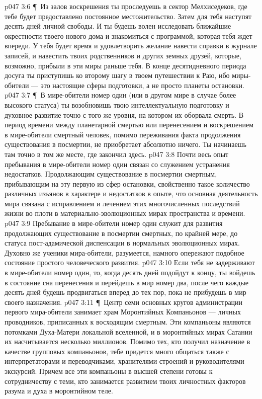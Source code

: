 \vs p047 3:6 \P\ Из залов воскрешения ты проследуешь в сектор Мелхиседеков, где тебе будет предоставлено постоянное местожительство. Затем для тебя наступят десять дней личной свободы. И ты будешь волен исследовать ближайшие окрестности твоего нового дома и знакомиться с программой, которая тебя ждет впереди. У тебя будет время и удовлетворить желание навести справки в журнале записей, и навестить твоих родственников и других земных друзей, которые, возможно, прибыли в эти миры раньше тебя. В конце десятидневного периода досуга ты приступишь ко второму шагу в твоем путешествии к Раю, ибо миры\hyp{}обители --- это настоящие сферы подготовки, а не просто планеты остановки.
\vs p047 3:7 \P\ В мире\hyp{}обители номер один (или в другом мире в случае более высокого статуса) ты возобновишь твою интеллектуальную подготовку и духовное развитие точно с того же уровня, на котором их оборвала смерть. В период времени между планетарной смертью или перенесением и воскрешением в мире\hyp{}обители смертный человек, помимо переживания факта продолжения существования в посмертии, не приобретает абсолютно ничего. Ты начинаешь там точно в том же месте, где закончил здесь.
\vs p047 3:8 Почти весь опыт пребывания в мире\hyp{}обители номер один связан со служением устранения недостатков. Продолжающим существование в посмертии смертным, прибывающим на эту первую из сфер остановки, свойственно такое количество различных изъянов в характере и недостатков в опыте, что основная деятельность мира связана с исправлением и лечением этих многочисленных последствий жизни во плоти в материально\hyp{}эволюционных мирах пространства и времени.
\vs p047 3:9 Пребывание в мире\hyp{}обители номер один служит для развития продолжающих существование в посмертии смертных, по крайней мере, до статуса пост\hyp{}адамической диспенсации в нормальных эволюционных мирах. Духовно же ученики мира\hyp{}обители, разумеется, намного опережают подобное состояние простого человеческого развития.
\vs p047 3:10 Если тебя не задерживают в мире\hyp{}обители номер один, то, когда десять дней подойдут к концу, ты войдешь в состояние сна перенесения и перейдешь в мир номер два, после чего каждые десять дней будешь продвигаться вперед до тех пор, пока не прибудешь в мир своего назначения.
\vs p047 3:11 \P\ Центр семи основных кругов администрации первого мира\hyp{}обители занимает храм Моронтийных Компаньонов --- личных проводников, приписанных к восходящим смертным. Эти компаньоны являются потомками Духа\hyp{}Матери локальной вселенной, и в моронтийных мирах Сатании их насчитывается несколько миллионов. Помимо тех, кто получил назначение в качестве групповых компаньонов, тебе придется много общаться также с интерпретаторами и переводчиками, хранителями строений и руководителями экскурсий. Причем все эти компаньоны в высшей степени готовы к сотрудничеству с теми, кто занимается развитием твоих личностных факторов разума и духа в моронтийном теле.
